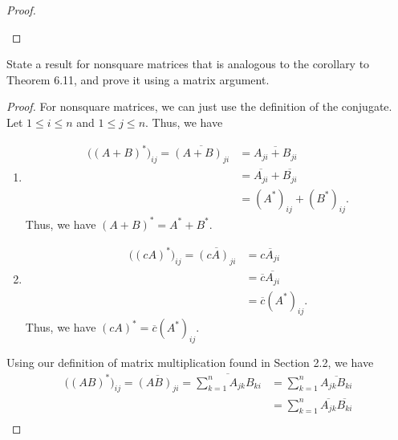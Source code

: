 \begin{enumerate}
\begin{proof}
\begin{enumerate}
\end{enumerate}
\end{proof}
    \item[(b)] State a result for nonsquare matrices that is analogous to the corollary to Theorem 6.11, and prove it using a matrix argument.
        \begin{proof}
        For nonsquare matrices, we can just use the definition of the conjugate. Let \( 1 \leq i \leq n  \) and \( 1 \leq j \leq n   \). Thus, we have
        \begin{enumerate}
            \item[(a)] 
                \begin{align*}
                    \Big( (A+B)^{*} \Big)_{ij} = \overline{{(A+B)}_{ji}} &= \overline{{A}_{ji} + {B}_{ji}} \\
                                                                         &= \overline{{A}_{ji}} + \overline{{B}_{ji}} \\
                                                                         &= {(A^{*})}_{ij} + {(B^{*})}_{ij}.
                \end{align*}
                Thus, we have \( (A+B)^{*} = A^{*} + B^{*} \).
            \item[(b)] 
                \begin{align*}
                    \Big( (cA)^{*} \Big)_{ij} = \overline{(cA)_{ji}} &= \overline{c {A}_{ji}} \\
                                                                     &= \overline{c} \overline{{A}_{ji}} \\
                                                                     &= \overline{c} {(A^{*})}_{ij}.
                \end{align*}
                Thus, we have \( (cA)^{*} = \overline{c} {(A^{*})}_{ij}. \)
        \end{enumerate}
        \item[(c)] Using our definition of matrix multiplication found in Section 2.2, we have
            \begin{align*}
                \Big( (AB)^{*} \Big)_{ij} = \overline{{(AB)}_{ji}} = \overline{\sum_{ k=1  }^{ n } {A}_{jk} {B}_{ki}} 
                                                                   &= \sum_{ k=1  }^{ n } \overline{{A}_{jk} {B}_{ki}} \\
                                                                   &=\sum_{ k=1  }^{ n } \overline{{A}_{jk}} \overline{{B}_{ki}} \\

\end{align*}
\end{proof}
\end{enumerate}

